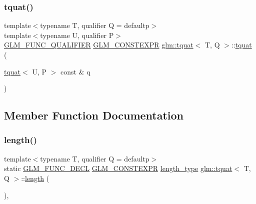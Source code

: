 \subsubsection{\texorpdfstring{tquat()}{tquat()}\hspace{0.1cm}{\footnotesize\ttfamily [12/12]}}
{\footnotesize\ttfamily template$<$typename T, qualifier Q = defaultp$>$ \\
template$<$typename U, qualifier P$>$ \\
\mbox{\hyperlink{setup_8hpp_a33fdea6f91c5f834105f7415e2a64407}{G\+L\+M\+\_\+\+F\+U\+N\+C\+\_\+\+Q\+U\+A\+L\+I\+F\+I\+ER}} \mbox{\hyperlink{setup_8hpp_a08b807947b47031d3a511f03f89645ad}{G\+L\+M\+\_\+\+C\+O\+N\+S\+T\+E\+X\+PR}} \mbox{\hyperlink{structglm_1_1tquat}{glm\+::tquat}}$<$ T, Q $>$\+::\mbox{\hyperlink{structglm_1_1tquat}{tquat}} (\begin{DoxyParamCaption}\item[{\mbox{\hyperlink{structglm_1_1tquat}{tquat}}$<$ U, P $>$ const \&}]{q }\end{DoxyParamCaption})}



\subsection{Member Function Documentation}
\mbox{\label{structglm_1_1tquat_a7cf19acd1bf11bdf0f52dbc16b3dee53}} 
\subsubsection{\texorpdfstring{length()}{length()}}
{\footnotesize\ttfamily template$<$typename T, qualifier Q = defaultp$>$ \\
static \mbox{\hyperlink{setup_8hpp_ab2d052de21a70539923e9bcbf6e83a51}{G\+L\+M\+\_\+\+F\+U\+N\+C\+\_\+\+D\+E\+CL}} \mbox{\hyperlink{setup_8hpp_a08b807947b47031d3a511f03f89645ad}{G\+L\+M\+\_\+\+C\+O\+N\+S\+T\+E\+X\+PR}} \mbox{\hyperlink{structglm_1_1tquat_a6d9ab28781d7835b30216a996484c026}{length\+\_\+type}} \mbox{\hyperlink{structglm_1_1tquat}{glm\+::tquat}}$<$ T, Q $>$\+::\mbox{\hyperlink{_s_d_l__opengl__glext_8h_ab9c919755bde3b34349e23a32b4e0fa7}{length}} (\begin{DoxyParamCaption}{ }\end{DoxyParamCaption})\hspace{0.3cm}{\ttfamily [inline]}, {\ttfamily [static]}}



